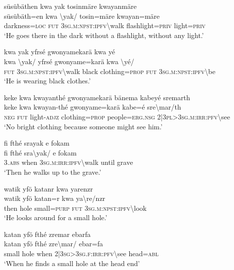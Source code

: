 \ea\label{ex:a4269}
süsübäthen kwa yak tosinmäre kwayanmäre\\
\gll süsübäth=en	kwa	{\textbackslash}yak/	tosin=märe	kwayan=märe\\
     darkness=\textsc{loc}	\textsc{fut}	3\textsc{sg}.\textsc{m}:\textsc{npst}:\textsc{ipfv}{\textbackslash}walk	flashlight=\textsc{priv}	light=\textsc{priv}\\
\glt `He goes there in the dark without a flashlight, without any light.'
\z

\ea\label{ex:a4272}
kwa yak yfrsé gwonyamekarä kwa yé\\
\gll kwa	{\textbackslash}yak/	yfrsé	gwonyame=karä	kwa	{\textbackslash}yé/\\
     \textsc{fut}	3\textsc{sg}.\textsc{m}:\textsc{npst}:\textsc{ipfv}{\textbackslash}walk	black	clothing=\textsc{prop}	\textsc{fut}	3\textsc{sg}.\textsc{m}:\textsc{npst}:\textsc{ipfv}{\textbackslash}be\\
\glt `He is wearing black clothes.'
\z

\ea\label{ex:a4274}
keke kwa kwayanthé gwonyamekarä bänema kabeyé sremarth\\
\gll keke	kwa	kwayan-thé	gwonyame=karä	kabe=é	sre{\textbackslash}mar/th\\
     \textsc{neg}	\textsc{fut}	light-\textsc{adjz}	clothing=\textsc{prop}	people=\textsc{erg}.\textsc{nsg}	2|3\textsc{pl}>3\textsc{sg}.\textsc{m}:\textsc{irr}:\textsc{pfv}{\textbackslash}see\\
\glt `No bright clothing because someone might see him.'
\z

\ea\label{ex:a4275}
fi fthé srayak e fokam\\
\gll fi	fthé	sra{\textbackslash}yak/	e	fokam\\
     3.\textsc{abs}	when	3\textsc{sg}.\textsc{m}:\textsc{irr}:\textsc{ipfv}{\textbackslash}walk	until	grave\\
\glt `Then he walks up to the grave.'
\z

\ea\label{ex:a4276}
watik yfö katanr kwa yarenzr\\
\gll watik	yfö	katan=r	kwa	ya{\textbackslash}re/nzr\\
     then	hole	small=\textsc{purp}	\textsc{fut}	3\textsc{sg}.\textsc{m}:\textsc{npst}:\textsc{ipfv}{\textbackslash}look\\
\glt `He looks around for a small hole.'
\z

\ea\label{ex:a4277}
katan yfö fthé zremar ebarfa\\
\gll katan	yfö	fthé	zre{\textbackslash}mar/	ebar=fa\\
     small	hole	when	2|3\textsc{sg}>3\textsc{sg}.\textsc{f}:\textsc{irr}:\textsc{pfv}{\textbackslash}see	head=\textsc{abl}\\
\glt `When he finds a small hole at the head end'
\z

